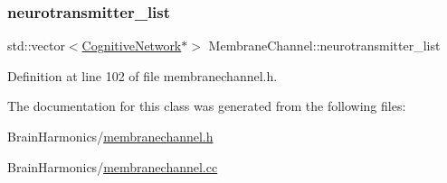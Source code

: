 \subsubsection{\texorpdfstring{neurotransmitter\+\_\+list}{neurotransmitter\_list}}
{\footnotesize\ttfamily std\+::vector$<$\hyperlink{class_cognitive_network}{Cognitive\+Network}$\ast$$>$ Membrane\+Channel\+::neurotransmitter\+\_\+list\hspace{0.3cm}{\ttfamily [protected]}}



Definition at line 102 of file membranechannel.\+h.



The documentation for this class was generated from the following files\+:\begin{DoxyCompactItemize}
\item 
Brain\+Harmonics/\hyperlink{membranechannel_8h}{membranechannel.\+h}\item 
Brain\+Harmonics/\hyperlink{membranechannel_8cc}{membranechannel.\+cc}\end{DoxyCompactItemize}
